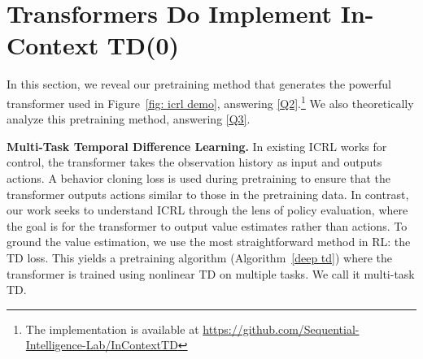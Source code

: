 \documentclass{article}
\begin{document}
\section{Transformers Do Implement In-Context TD(0)}\label{sec: transformers do implement TD(0)}
In this section,
we reveal our pretraining method that generates the powerful transformer used in Figure~\ref{fig: icrl demo},
answering \ref{Q2}.\footnote{The implementation is available at \url{https://github.com/Sequential-Intelligence-Lab/InContextTD}}
We also theoretically analyze this pretraining method,
answering \ref{Q3}.

\textbf{Multi-Task Temporal Difference Learning.}
In existing ICRL works for control,
the transformer takes the observation history as input and outputs actions.
A behavior cloning loss is used during pretraining to ensure that the transformer outputs actions similar to those in the pretraining data. In contrast, our work seeks to understand ICRL through the lens of policy evaluation, where the goal is for the transformer to output value estimates rather than actions. To ground the value estimation, we use the most straightforward method in RL: the TD loss. This yields a pretraining algorithm (Algorithm~\ref{deep td}) where the transformer is trained using nonlinear TD on multiple tasks. We call it multi-task TD.
\end{document}
